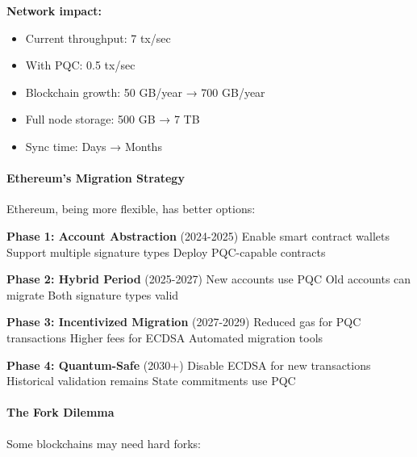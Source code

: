 \documentclass[11pt,a4paper]{article}
\begin{document}
\textbf{Network impact:}
\begin{itemize}
    \item Current throughput: 7 tx/sec
    \item With PQC: 0.5 tx/sec
    \item Blockchain growth: 50 GB/year → 700 GB/year
    \item Full node storage: 500 GB → 7 TB
    \item Sync time: Days → Months
\end{itemize}

\paragraph{Ethereum's Migration Strategy}

Ethereum, being more flexible, has better options:

\begin{algorithm}
\caption{Ethereum's Planned PQC Migration}
\label{alg:eth-pqc}
\begin{algorithmic}[1]
\State \textbf{Phase 1: Account Abstraction} (2024-2025)
\State \quad Enable smart contract wallets
\State \quad Support multiple signature types
\State \quad Deploy PQC-capable contracts

\State \textbf{Phase 2: Hybrid Period} (2025-2027)
\State \quad New accounts use PQC
\State \quad Old accounts can migrate
\State \quad Both signature types valid

\State \textbf{Phase 3: Incentivized Migration} (2027-2029)
\State \quad Reduced gas for PQC transactions
\State \quad Higher fees for ECDSA
\State \quad Automated migration tools

\State \textbf{Phase 4: Quantum-Safe} (2030+)
\State \quad Disable ECDSA for new transactions
\State \quad Historical validation remains
\State \quad State commitments use PQC
\end{algorithmic}
\end{algorithm}

\paragraph{The Fork Dilemma}

Some blockchains may need hard forks:
\end{document}
